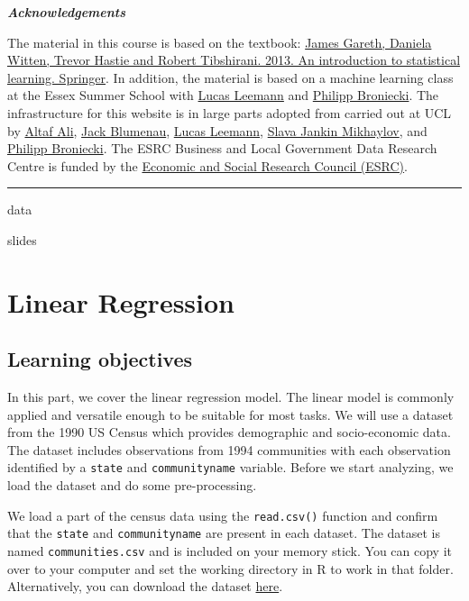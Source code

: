 \documentclass[]{article}
\begin{document}
\textbf{\emph{Acknowledgements}}

The material in this course is based on the textbook: \href{http://faculty.marshall.usc.edu/gareth-james/ISL/ISLR\%20Seventh\%20Printing.pdf}{James Gareth, Daniela Witten, Trevor Hastie and Robert Tibshirani. 2013. An introduction to statistical learning. Springer}. In addition, the material is based on a machine learning class at the Essex Summer School with \href{https://lucasleemann.ch}{Lucas Leemann} and \href{https://philippbroniecki.com}{Philipp Broniecki}. The infrastructure for this website is in large parts adopted from carried out at UCL by \href{https://iris.ucl.ac.uk/iris/browse/profile?upi=ALIAX58}{Altaf Ali}, \href{https://www.jackblumenau.com/}{Jack Blumenau}, \href{https://lucasleemann.ch}{Lucas Leemann}, \href{https://sjankin.com/}{Slava Jankin Mikhaylov}, and \href{https://philippbroniecki.com}{Philipp Broniecki}. The ESRC Business and Local Government Data Research Centre is funded by the \href{https://esrc.ukri.org}{Economic and Social Research Council (ESRC)}.

\begin{center}\rule{0.5\linewidth}{\linethickness}\end{center}

data

slides

\hypertarget{linear-regression}{%
\section{Linear Regression}\label{linear-regression}}

\hypertarget{learning-objectives}{%
\subsection{Learning objectives}\label{learning-objectives}}

In this part, we cover the linear regression model. The linear model is commonly applied and versatile enough to be suitable for most tasks. We will use a dataset from the 1990 US Census which provides demographic and socio-economic data. The dataset includes observations from 1994 communities with each observation identified by a \texttt{state} and \texttt{communityname} variable. Before we start analyzing, we load the dataset and do some pre-processing.

We load a part of the census data using the \texttt{read.csv()} function and confirm that the \texttt{state} and \texttt{communityname} are present in each dataset. The dataset is named \texttt{communities.csv} and is included on your memory stick. You can copy it over to your computer and set the working directory in R to work in that folder. Alternatively, you can download the dataset \href{http://philippbroniecki.github.io/ML2017.io/data/communities.csv}{here}.
\end{document}
